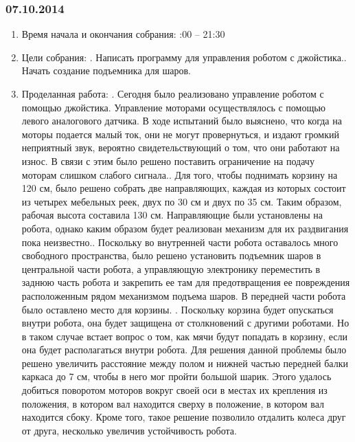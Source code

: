 \documentclass[12pt]{article}
\begin{document}
	      \subsubsection{07.10.2014}
	      \begin{enumerate}
	      	\item Время начала и окончания собрания:
	      	:00 – 21:30
	      	\item Цели собрания:
	      	.	 Написать программу для управления роботом с джойстика..	Начать создание подъемника для шаров.
	      	\item Проделанная работа:
	      	.	Сегодня было реализовано управление роботом с помощью джойстика. Управление моторами осуществлялось с помощью левого аналогового датчика. В ходе испытаний было выяснено, что когда на моторы подается малый ток, они не могут провернуться, и издают громкий неприятный звук, вероятно свидетельствующий о том, что они работают на износ. В связи с этим было решено поставить ограничение на подачу моторам слишком слабого сигнала..	Для того, чтобы поднимать корзину на 120 см, было решено собрать две направляющих, каждая из которых состоит из четырех мебельных реек, двух по 30 см и двух по 35 см. Таким образом, рабочая высота составила 130 см. Направляющие были установлены на робота, однако каким образом будет реализован механизм для их раздвигания пока неизвестно..	Поскольку во внутренней части робота оставалось много свободного пространства, было решено установить подъемник шаров в центральной части робота, а управляющую электронику переместить в заднюю часть робота и закрепить ее там для предотвращения ее повреждения расположенным рядом механизмом подъема шаров. В передней части робота было оставлено место для корзины. .	Поскольку корзина будет опускаться внутри робота, она будет защищена от столкновений с другими роботами. Но в таком случае встает вопрос о том, как мячи будут попадать в корзину, если она будет располагаться внутри робота. Для решения данной проблемы было решено увеличить расстояние между полом и нижней частью передней балки каркаса до 7 см, чтобы в него мог пройти большой шарик. Этого удалось добиться поворотом моторов вокруг своей оси в местах их крепления из положения, в котором вал находится сверху в положение, в котором вал находится сбоку. Кроме того, такое решение позволило отдалить колеса друг от друга, несколько увеличив устойчивость робота.\newline

\end{enumerate}
\end{document}
